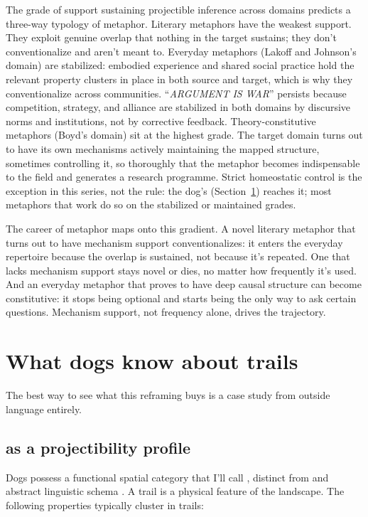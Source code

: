 \documentclass[12pt]{article}
\newcommand{\metaphor}[1]{\enquote{\textit{\MakeUppercase{#1}}}}
\begin{document}
The grade of support sustaining projectible inference across domains predicts a three-way typology of metaphor. Literary metaphors have the weakest support. They exploit genuine overlap that nothing in the target sustains; they don't conventionalize and aren't meant to. Everyday metaphors (Lakoff and Johnson's domain) are stabilized: embodied experience and shared social practice hold the relevant property clusters in place in both source and target, which is why they conventionalize across communities. \metaphor{argument is war} persists because competition, strategy, and alliance are stabilized in both domains by discursive norms and institutions, not by corrective feedback. Theory-constitutive metaphors (Boyd's domain) sit at the highest grade. The target domain turns out to have its own mechanisms actively maintaining the mapped structure, sometimes controlling it, so thoroughly that the metaphor becomes indispensable to the field and generates a research programme. Strict homeostatic control is the exception in this series, not the rule: the dog's  (Section~\ref{sec:dogs}) reaches it; most metaphors that work do so on the stabilized or maintained grades.

The career of metaphor \citep{bowdle2005} maps onto this gradient. A novel literary metaphor that turns out to have mechanism support conventionalizes: it enters the everyday repertoire because the overlap is sustained, not because it's repeated. One that lacks mechanism support stays novel or dies, no matter how frequently it's used. And an everyday metaphor that proves to have deep causal structure can become constitutive: it stops being optional and starts being the only way to ask certain questions. Mechanism support, not frequency alone, drives the trajectory.

\section{What dogs know about trails}
\label{sec:dogs}

The best way to see what this reframing buys is a case study from outside language entirely.

\subsection{ as a projectibility profile}

Dogs possess a functional spatial category that I'll call , distinct from  and  abstract linguistic schema . A trail is a physical feature of the landscape. The following properties typically cluster in trails:
\end{document}
